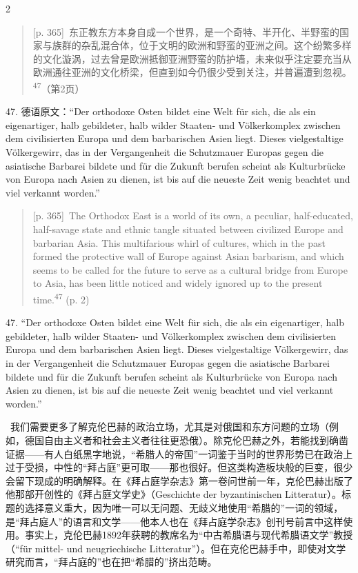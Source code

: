 \documentclass[10pt,a4paper]{article}
\begin{document}
\begin{paracol}{2}
\switchcolumn*
\begin{quote}{\scriptsize\color{gray}[p. 365]}\ 东正教东方本身自成一个世界，是一个奇特、半开化、半野蛮的国家与族群的杂乱混合体，位于文明的欧洲和野蛮的亚洲之间。这个纷繁多样的文化漩涡，过去曾是欧洲抵御亚洲野蛮的防护墙，未来似乎注定要充当从欧洲通往亚洲的文化桥梁，但直到如今仍很少受到关注，并普遍遭到忽视。\nobreak\textsuperscript{47}（第2页）\par\end{quote}{\small 47. 德语原文：“Der orthodoxe Osten bildet eine Welt für sich, die als ein eigenartiger, halb gebildeter, halb wilder Staaten- und Völkerkomplex zwischen dem civilisierten Europa und dem barbarischen Asien liegt. Dieses vielgestaltige Völkergewirr, das in der Vergangenheit die Schutzmauer Europas gegen die asiatische Barbarei bildete und für die Zukunft berufen scheint als Kulturbrücke von Europa nach Asien zu dienen, ist bis auf die neueste Zeit wenig beachtet und viel verkannt worden.”\par}
\switchcolumn
\begin{quote}{\scriptsize\color{gray}[p. 365]}\ The Orthodox East is a world of its own, a peculiar, half-educated, half-savage state and ethnic tangle situated between civilized Europe and barbarian Asia. This multifarious whirl of cultures, which in the past formed the protective wall of Europe against Asian barbarism, and which seems to be called for the future to serve as a cultural bridge from Europe to Asia, has been little noticed and widely ignored up to the present time.\nobreak\textsuperscript{47} (p. 2)\par\end{quote}{\small 47. “Der orthodoxe Osten bildet eine Welt für sich, die als ein eigenartiger, halb gebildeter, halb wilder Staaten- und Völkerkomplex zwischen dem civilisierten Europa und dem barbarischen Asien liegt. Dieses vielgestaltige Völkergewirr, das in der Vergangenheit die Schutzmauer Europas gegen die asiatische Barbarei bildete und für die Zukunft berufen scheint als Kulturbrücke von Europa nach Asien zu dienen, ist bis auf die neueste Zeit wenig beachtet und viel verkannt worden.”\par}
\switchcolumn*
{\scriptsize\color{gray}[p. 365]}\ 我们需要更多了解克伦巴赫的政治立场，尤其是对俄国和东方问题的立场（例如，德国自由主义者和社会主义者往往更恐俄）。除克伦巴赫之外，若能找到确凿证据——有人白纸黑字地说，“希腊人的帝国”一词鉴于当时的世界形势已在政治上过于受损，中性的“拜占庭”更可取——那也很好。但这类构造板块般的巨变，很少会留下现成的明确解释。在《拜占庭学杂志》第一卷问世前一年，克伦巴赫出版了他那部开创性的《拜占庭文学史》（Geschichte der byzantinischen Litteratur）。标题的选择意义重大，因为唯一可以无问题、无歧义地使用“希腊的”一词的领域，是“拜占庭人”的语言和文学——他本人也在《拜占庭学杂志》创刊号前言中这样使用。事实上，克伦巴赫1892年获聘的教席名为“中古希腊语与现代希腊语文学”教授（“für mittel- und neugriechische Litteratur”）。但在克伦巴赫手中，即使对文学研究而言，“拜占庭的”也在把“希腊的”挤出范畴。\par

\end{paracol}
\end{document}
